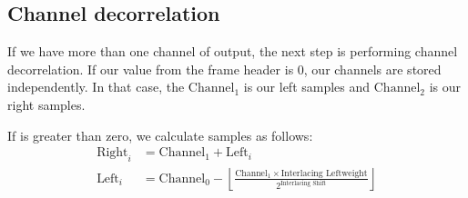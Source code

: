 \clearpage

\subsection{Channel decorrelation}

If we have more than one channel of output, the next step is
performing channel decorrelation.
If our  value from the frame header is 0,
our channels are stored independently.
In that case, the $\text{Channel}_1$ is our left samples and
$\text{Channel}_2$ is our right samples.

If  is greater than zero,
we calculate samples as follows:
\begin{align*}
\text{Right}_i &= \text{Channel}_1 + \text{Left}_i \\
\text{Left}_i &= \text{Channel}_0 - \left\lfloor\frac{\text{Channel}_1 \times \text{Interlacing Leftweight}}{2 ^ \text{Interlacing Shift}}\right\rfloor 
\end{align*}
